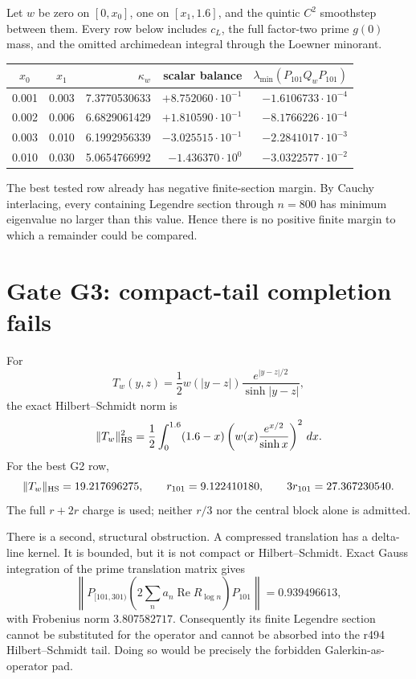 \documentclass[11pt]{article}
\begin{document}
Let $w$ be zero on $[0,x_0]$, one on $[x_1,1.6]$, and the quintic
$C^2$ smoothstep between them.  Every row below includes
$c_L$, the full factor-two prime $g(0)$ mass, and the omitted
archimedean integral through the Loewner minorant.

\begin{center}
\small
\begin{tabular}{@{}ccrrr@{}}
\toprule
$x_0$ & $x_1$ & $\kappa_w$ & scalar balance
 & $\lambda_{\min}(P_{101}Q_wP_{101})$\\
\midrule
0.001&0.003&7.3770530633&$+8.752060\cdot10^{-1}$&$-1.6106733\cdot10^{-4}$\\
0.002&0.006&6.6829061429&$+1.810590\cdot10^{-1}$&$-8.1766226\cdot10^{-4}$\\
0.003&0.010&6.1992956339&$-3.025515\cdot10^{-1}$&$-2.2841017\cdot10^{-3}$\\
0.010&0.030&5.0654766992&$-1.436370\cdot10^{0}$&$-3.0322577\cdot10^{-2}$\\
\bottomrule
\end{tabular}
\end{center}

The best tested row already has negative finite-section margin.
By Cauchy interlacing, every containing Legendre section through
$n=800$ has minimum eigenvalue no larger than this value.  Hence
there is no positive finite margin to which a remainder could be
compared.

\section{Gate G3: compact-tail completion fails}

For
\[
 T_w(y,z)=\frac12w(|y-z|)
 \frac{e^{|y-z|/2}}{\sinh|y-z|},
\]
the exact Hilbert--Schmidt norm is
\[
 \|T_w\|_{\rm HS}^2
 =\frac12\int_0^{1.6}(1.6-x)
   \left(w(x)\frac{e^{x/2}}{\sinh x}\right)^2\,dx .
\]
For the best G2 row,
\[
 \|T_w\|_{\rm HS}=19.217696275,\qquad
 r_{101}=9.122410180,\qquad
 3r_{101}=27.367230540.
\]
The full $r+2r$ charge is used; neither $r/3$ nor the central block
alone is admitted.

There is a second, structural obstruction.  A compressed translation
has a delta-line kernel.  It is bounded, but it is not compact or
Hilbert--Schmidt.  Exact Gauss integration of the prime translation
matrix gives
\[
 \left\|P_{[101,301)}
   \left(2\sum_n a_n\operatorname{Re}R_{\log n}\right)P_{101}
 \right\|=0.939496613,
\]
with Frobenius norm $3.807582717$.  Consequently its finite Legendre
section cannot be substituted for the operator and cannot be absorbed
into the r494 Hilbert--Schmidt tail.  Doing so would be precisely the
forbidden Galerkin-as-operator pad.
\end{document}
